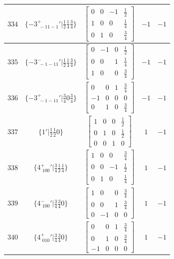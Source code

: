 \documentclass[fleqn,8pt]{jsarticle}
\begin{document}
\begin{longtable}{ccccc}
$ 334 $ & $ \{-3^{+}_{\,\,-11-1}{}'|\frac{1}{2} \frac{1}{4} \frac{3}{4}\} $ & $ \begin{bmatrix} 0 & 0 & -1 & \frac{1}{2} \\ 1 & 0 & 0 & \frac{1}{4} \\ 0 & 1 & 0 & \frac{3}{4} \end{bmatrix} $ & $ -1 $ & $ -1 $ \\ \hline
$ 335 $ & $ \{-3^{-}_{\,\,-1-11}{}'|\frac{1}{2} \frac{1}{4} \frac{3}{4}\} $ & $ \begin{bmatrix} 0 & -1 & 0 & \frac{1}{2} \\ 0 & 0 & 1 & \frac{1}{4} \\ 1 & 0 & 0 & \frac{3}{4} \end{bmatrix} $ & $ -1 $ & $ -1 $ \\ \hline
$ 336 $ & $ \{-3^{+}_{\,\,-1-11}{}'|\frac{3}{4} 0 \frac{3}{4}\} $ & $ \begin{bmatrix} 0 & 0 & 1 & \frac{3}{4} \\ -1 & 0 & 0 & 0 \\ 0 & 1 & 0 & \frac{3}{4} \end{bmatrix} $ & $ -1 $ & $ -1 $ \\ \hline
$ 337 $ & $ \{1{}'|\frac{1}{2} \frac{1}{2} 0\} $ & $ \begin{bmatrix} 1 & 0 & 0 & \frac{1}{2} \\ 0 & 1 & 0 & \frac{1}{2} \\ 0 & 0 & 1 & 0 \end{bmatrix} $ & $ 1 $ & $ -1 $ \\ \hline
$ 338 $ & $ \{4^{+}_{\,\,100}{}'|\frac{3}{4} \frac{1}{2} \frac{1}{4}\} $ & $ \begin{bmatrix} 1 & 0 & 0 & \frac{3}{4} \\ 0 & 0 & -1 & \frac{1}{2} \\ 0 & 1 & 0 & \frac{1}{4} \end{bmatrix} $ & $ 1 $ & $ -1 $ \\ \hline
$ 339 $ & $ \{4^{-}_{\,\,100}{}'|\frac{3}{4} \frac{3}{4} 0\} $ & $ \begin{bmatrix} 1 & 0 & 0 & \frac{3}{4} \\ 0 & 0 & 1 & \frac{3}{4} \\ 0 & -1 & 0 & 0 \end{bmatrix} $ & $ 1 $ & $ -1 $ \\ \hline
$ 340 $ & $ \{4^{+}_{\,\,010}{}'|\frac{3}{4} \frac{3}{4} 0\} $ & $ \begin{bmatrix} 0 & 0 & 1 & \frac{3}{4} \\ 0 & 1 & 0 & \frac{3}{4} \\ -1 & 0 & 0 & 0 \end{bmatrix} $ & $ 1 $ & $ -1 $ \\ \hline

\end{longtable}
\end{document}
